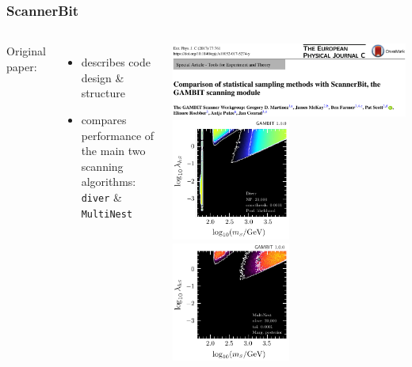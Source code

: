 \documentclass[aspectratio=169]{beamer}
\begin{document}
\begin{frame}
    \frametitle{ScannerBit~}
    \begin{columns}
        Original paper:
        \begin{itemize}
            \item describes code design \& structure
            \item compares performance of the main two scanning algorithms: \texttt{diver} \& \texttt{MultiNest} 
        \end{itemize}
        
        \includegraphics[width=\textwidth]{figures/scannerbit_header}
        \includegraphics[width=0.5\textwidth]{figures/scannerbit_15d_diver_profile}%
        \includegraphics[width=0.5\textwidth]{figures/scannerbit_15d_mn_posterior}
    \end{columns}
\end{frame}
\end{document}
